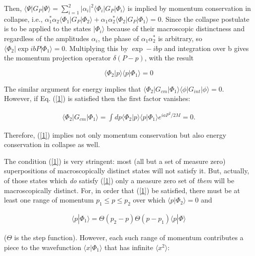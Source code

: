 \documentclass[12pt]{article}
\begin{document}
	Then, $\langle\Psi |G_{P}|\Psi\rangle=\sum_{i=1}^{2}|\alpha_{i}|^{2}\langle\Phi_{i}|G_{P}|\Phi_{i}\rangle$ 
is implied by momentum conservation in collapse,  
i.e., $\alpha ^{*}_{1}\alpha_{2}\langle\Phi_{1}|G_{P}|\Phi_{2}\rangle+
\alpha_{1}\alpha^{*}_{2}\langle\Phi_{2}|G_{P}|\Phi_{1}\rangle =0$.  Since the collapse 
postulate is to be applied to the states $|\Phi_{i}\rangle$ because of their macroscopic distinctness 
and regardless of the amplitudes $\alpha_{i}$, the phase of 
$\alpha_{1}\alpha ^{*}_{2}$ is arbitrary, so $\langle\Phi_{2}|\exp ibP|\Phi_{1}\rangle=0$.  
Multiplying this by $\exp -ibp$ and integration over b gives the momentum projection operator $\delta(P-p)$, 
with the result 

\begin{equation}\label{1}
 \langle \Phi_{2}|p\rangle\langle p|\Phi_{1}\rangle =0
\end{equation} 

	The similar argument for energy implies that 
$\langle\Phi_{2}|G_{cm}|\Phi_{1}\rangle \langle\phi |G_{int}|\phi \rangle =0$.  However, 
if Eq. (\ref{1}) is satisfied then the first factor vanishes: 

\begin{eqnarray*}
\langle\Phi_{2}|G_{cm}|\Phi_{1}\rangle=\int dp\langle\Phi_{2}|p\rangle\langle p|\Phi_{1}\rangle e^{iaP^{2}/2M}=0.     
\end{eqnarray*}

\noindent Therefore, (\ref{1}) implies not only momentum conservation but 
also energy conservation in collapse as well. 
 
	The condition (\ref{1}) is very stringent: most (all but a set of measure zero) 
superpositions of macroscopically distinct states will not satisfy it. But, actually, 
of those states which {\it do} satisfy (\ref{1}) only a measure zero set of {\it them} will 
be macroscopically distinct. For, in order that (\ref{1}) be satisfied, 
there must be at least one range of momentum 
$p_{1}\leq p\leq p_{2}$ over which $\langle p|\Phi_{2}\rangle=0$ and 


\begin{eqnarray*}
\langle p|\Phi_{1}\rangle = \Theta (p_{2}-p)\Theta (p-p_{1})\langle p|\Phi\rangle    
\end{eqnarray*}

\noindent ($\Theta$ is the step function).  However, each such range of momentum contributes a piece 
to the wavefunction $\langle x|\Phi_{1}\rangle$ that has infinite $\langle x^{2}\rangle$: 
\end{document}

